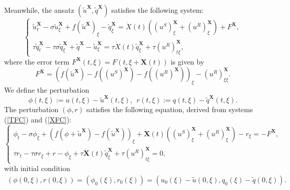 \documentclass[10pt,reqno]{amsart}
\numberwithin{equation}{section}
\begin{document}
	Meanwhile, the ansatz $\left(\tilde{u}^{\mathbf{X}},\tilde{q}^{\mathbf{X}}\right)$ satisfies the following system:
	\begin{equation} \label{XFC}
		\begin{cases}
			\tilde{u}_t^{\mathbf{X}} - \sigma \tilde{u}_{\xi}^{\mathbf{X}} + f\left(\tilde{u}^{\mathbf{X}}\right)_{\xi} - \tilde{q}_{\xi}^{\mathbf{X}} = \dot{X}(t)\left(\left(u^S\right)_{\xi}^{\mathbf{X}}+ \left(u^R\right)_{\xi}^{\mathbf{X}}\right) + F^{\mathbf{X}}, \\
			\tau\tilde{q}_t^{\mathbf{X}} - \tau \sigma \tilde{q}_{\xi}^{\mathbf{X}} + \tilde{q}^{\mathbf{X}} - \tilde{u}_{\xi}^{\mathbf{X}} = \tau \dot{X}(t) \tilde{q}_{\xi}^{\mathbf{X}} + \tau \left(u^R\right)_{t\xi}^{\mathbf{X}},
		\end{cases}
	\end{equation}
	where the error term $F^{\mathbf{X}}(t,\xi)=F(t,\xi+\mathbf{X}(t))$ is given by
	\begin{equation}
		F^{\mathbf{X}}= \left(f\left(\tilde{u}^{\mathbf{X}}\right) - f\left(\left(u^S\right)^{\mathbf{X}}\right) - f\left(\left(u^R\right)^{\mathbf{X}}\right)\right)_{\xi}- \left(u^R\right)_{\xi\xi}^{\mathbf{X}}. 
	\end{equation}
	We define the perturbation
	\begin{equation}\label{P} 
		\phi(t, \xi) := u(t, \xi) - \tilde{u}^{\mathbf{X}}(t, \xi),\ \ r(t,\xi):=q(t,\xi)-\tilde{q}^{\mathbf{X}}(t,\xi). 
	\end{equation} 
	The perturbation $(\phi, r)$ satisfies the following equation, derived from systems (\ref{TFC}) and (\ref{XFC}):
	\begin{equation}\label{PFC}
		\left\{\begin{array}{l}\phi_{t}-\sigma \phi_{\xi}+\left(f\left(\phi+\tilde{u}^{\mathbf{X}}\right)-f\left(\tilde{u}^{\mathbf{X}}\right)\right)_{\xi}+\dot{\mathbf{X}}(t)\left(\left(u^{S}\right)_{\xi}^{\mathbf{X}}+\left(u^{R}\right)_{\xi}^{\mathbf{X}}\right)-r_{\xi}=-F^{\mathbf{X}}, \\ 
			\tau r_{t}-\tau\sigma r_{\xi}+r-\phi_{\xi}+\tau \dot{\mathbf{X}}(t) \tilde{q}_{\xi}^{\mathbf{X}}+\tau \left(u^{R}\right)_{t\xi}^{\mathbf{X}}=0,\end{array}\right. 
	\end{equation}
	with initial condition
	\begin{align}\label{initial}
		\left(\phi(0,\xi),r(0,\xi)\right)=\left(\phi_{0}(\xi),r_0(\xi)\right)=\left(u_0(\xi)-\tilde{u}(0,\xi),q_0(\xi)-\tilde{q}(0,\xi)\right).
	\end{align}
	
\end{document}
